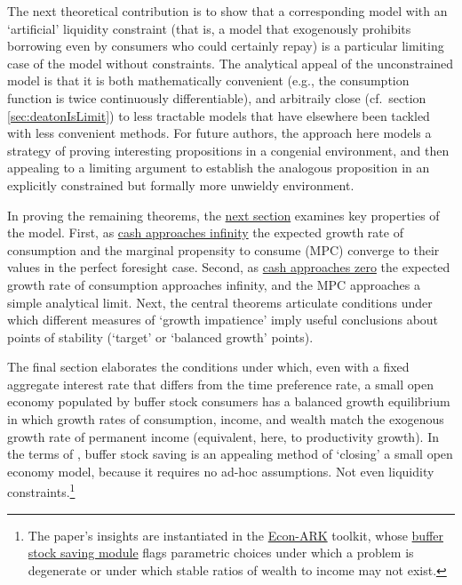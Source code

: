 \documentclass[BufferStockTheory]{subfiles}
\begin{document}
The next theoretical contribution is to show that a corresponding model with an `artificial' liquidity constraint (that is, a model that exogenously prohibits borrowing even by consumers who could certainly repay) is a particular limiting case of the model without constraints.  The analytical appeal of the unconstrained model is that it is both mathematically convenient (e.g., the consumption function is twice continuously differentiable), and arbitraily close (cf.\ section \ref{sec:deatonIsLimit}) to less tractable models that have elsewhere been tackled with less convenient methods.  For future authors, the approach here models a strategy of proving interesting propositions in a congenial environment, and then appealing to a limiting argument to establish the analogous proposition in an explicitly constrained but formally more unwieldy environment.
  
 In proving the remaining theorems, the \hyperlink{AnalysisoftheConvergedConsumptionFunction}{next section} examines key properties of the model. First, as \hyperlink{LimitsAsmtToInfty}{cash approaches infinity} the expected growth rate of consumption and the marginal propensity to consume (MPC) converge to their values in the perfect foresight case. Second, as \hyperlink{LimitsAsmtToZero}{cash approaches zero} the expected growth rate of consumption approaches infinity, and the MPC approaches a simple analytical limit.  Next, the central theorems articulate conditions under which different measures of `growth impatience' imply useful conclusions about points of stability (`target' or `balanced growth' points).  

The final section elaborates the conditions under which, even with a fixed aggregate interest rate that differs from the time preference rate, a small open economy populated by buffer stock consumers has a balanced growth equilibrium in which growth rates of consumption, income, and wealth match the exogenous growth rate of permanent income (equivalent, here, to productivity growth). In the terms of \cite{schmitt2003closing}, buffer stock saving is an appealing method of `closing' a small open economy model, because it requires no ad-hoc assumptions.  Not even liquidity constraints.\footnote{The paper's insights are instantiated in the \href{https://econ-ark.org}{Econ-ARK} toolkit, whose \href{https://hark.readthedocs.io/en/stable/reference/ConsumptionSaving/ConsIndShockModel.html}{buffer stock saving module} flags parametric choices under which a problem is degenerate or under which stable ratios of wealth to income may not exist.}
\end{document}
